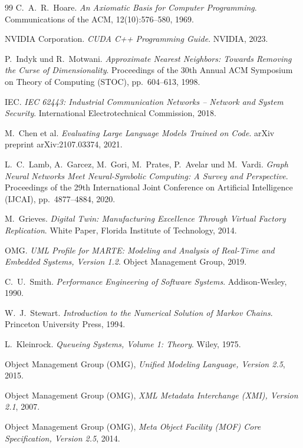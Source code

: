﻿\documentclass[a4paper,12pt]{report}
\theoremstyle{definition}
\begin{document}
\begin{thebibliography}{99}
C.~A.~R.~Hoare.
\textit{An Axiomatic Basis for Computer Programming}.
Communications of the ACM, 12(10):576--580, 1969.

NVIDIA Corporation.
\textit{CUDA C++ Programming Guide}.
NVIDIA, 2023.

P.~Indyk und R.~Motwani.
\textit{Approximate Nearest Neighbors: Towards Removing the Curse of Dimensionality}.
Proceedings of the 30th Annual ACM Symposium on Theory of Computing (STOC),
pp.~604--613, 1998.

IEC.
\textit{IEC 62443: Industrial Communication Networks -- Network and System Security}.
International Electrotechnical Commission, 2018.

M.~Chen et al.
\textit{Evaluating Large Language Models Trained on Code}.
arXiv preprint arXiv:2107.03374, 2021.

L.~C.~Lamb, A.~Garcez, M.~Gori, M.~Prates, P.~Avelar und M.~Vardi.
\textit{Graph Neural Networks Meet Neural-Symbolic Computing: A Survey and
Perspective}.
Proceedings of the 29th International Joint Conference on Artificial Intelligence
(IJCAI), pp.~4877--4884, 2020.

M.~Grieves.
\textit{Digital Twin: Manufacturing Excellence Through Virtual Factory Replication}.
White Paper, Florida Institute of Technology, 2014.

OMG.
\textit{UML Profile for MARTE: Modeling and Analysis of Real-Time and Embedded Systems, Version 1.2}.
Object Management Group, 2019.

C.~U.~Smith.
\textit{Performance Engineering of Software Systems}.
Addison-Wesley, 1990.

W.~J.~Stewart.
\textit{Introduction to the Numerical Solution of Markov Chains}.
Princeton University Press, 1994.

L.~Kleinrock.
\textit{Queueing Systems, Volume 1: Theory}.
Wiley, 1975.

	Object Management Group (OMG),
	\textit{Unified Modeling Language, Version 2.5},
	2015.

	Object Management Group (OMG),
	\textit{XML Metadata Interchange (XMI), Version 2.1},
	2007.

	Object Management Group (OMG),
	\textit{Meta Object Facility (MOF) Core Specification, Version 2.5},
	2014.


\end{thebibliography}
\end{document}
